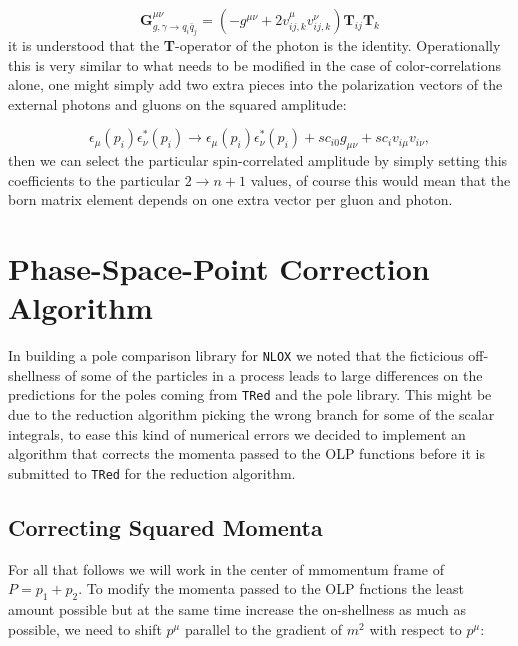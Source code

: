 \documentclass[a4paper]{article}
\def \NLOX{\texttt{NLOX} }
\def \TRed{\texttt{TRed} }
\begin{document}
\begin{equation}
 \textbf{G}_{g,\gamma \rightarrow q_i \bar q_j}^{\mu\nu} = 
 \left(
 -g^{\mu\nu}
 +
 2 v_{ij,k}^\mu v_{ij,k}^\nu
 \right)\textbf{T}_{ij}\textbf{T}_{k}
\end{equation}
it is understood that the \textbf{T}-operator of the photon is the identity.
Operationally this is very similar to what needs to be modified in the case of color-correlations alone,
one might simply add two extra pieces into the polarization vectors of the external photons and 
gluons on the squared amplitude:

\begin{equation}
    \epsilon_\mu(p_i)\epsilon^{*}_\nu(p_i) \rightarrow 
    \epsilon_\mu(p_i)\epsilon^{*}_\nu(p_i) + sc_{i0} g_{\mu\nu} + sc_{i} v_{i\mu} v_{i\nu},
\end{equation}
then we can select the particular spin-correlated amplitude by simply setting this coefficients 
to the particular $2\rightarrow n+1$ values, of course this would mean that the born matrix element
depends on one extra vector per gluon and photon.


\newpage
\section{Phase-Space-Point Correction Algorithm}
In building a pole comparison library for \NLOX we noted that the ficticious off-shellness of
some of the particles in a process leads to large differences on the predictions for the poles 
coming from \TRed and the pole library. This might be due to the reduction algorithm picking 
the wrong branch for some of the scalar integrals, to ease this kind of numerical errors we 
decided to implement an algorithm that corrects the momenta passed to the OLP functions before 
it is submitted to \TRed for the reduction algorithm.\\

\subsection{Correcting Squared Momenta}
For all that follows we will work in the center of mmomentum frame of $P=p_1+p_2$.
To modify the momenta passed to the OLP fnctions the least amount possible 
but  at the same time increase the on-shellness as much as possible, 
we need to shift $p^\mu$ parallel to the gradient of $m^2$ with respect to $p^\mu$:
\end{document}
